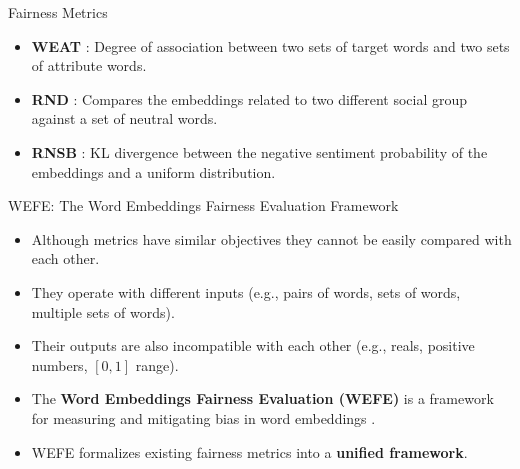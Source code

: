 \documentclass[handout]{beamer}
\begin{document}
\begin{frame}{Fairness Metrics}
\begin{scriptsize}

\begin{itemize}
 \item \textbf{WEAT} \cite{caliskan2017semantics}:  Degree of association between two sets of target words and two sets of attribute words.


\item \textbf{RND} \cite{garg2018word}: Compares the embeddings related to two different social group against a set of neutral words.

\item \textbf{RNSB} \cite{sweeney2019transparent}:  KL divergence between the negative sentiment probability of the embeddings and a uniform distribution.
\end{itemize}






\end{scriptsize}
\end{frame}


\begin{frame}{WEFE: The Word Embeddings Fairness Evaluation Framework}
\begin{scriptsize}
\begin{itemize}
\item Although metrics have similar objectives they cannot be easily compared with each other.
\item They operate with different inputs (e.g., pairs of words, sets of words, multiple sets of words).
\item Their outputs are also incompatible with each other (e.g., reals, positive numbers, $[0,1]$ range).
 \item The \textbf{Word Embeddings Fairness Evaluation (WEFE)} is a framework for measuring and mitigating bias in word embeddings \cite{badilla2020wefe}.

 \item  WEFE formalizes existing fairness metrics into a \textbf{unified framework}.
\end{itemize}

\end{scriptsize}
\end{frame}
\end{document}
